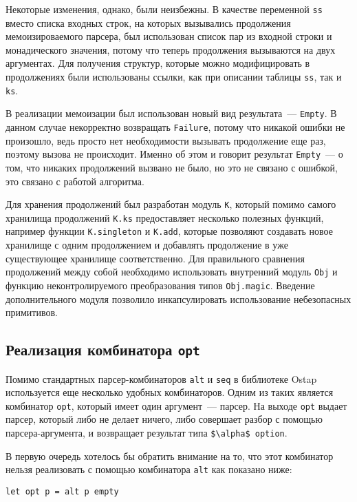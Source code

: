 \documentclass[conference]{IEEEtran}
\begin{document}
Некоторые изменения, однако, были неизбежны. В качестве переменной  \lstinline|ss| вместо списка входных строк, на которых вызывались продолжения мемоизироваемого парсера, был использован список
пар из входной строки и монадического значения, потому что теперь продолжения вызываются на двух аргументах. Для получения структур, которые можно модифицировать в продолжениях были
использованы ссылки, как при описании таблицы \lstinline|ss|, так и \lstinline|ks|.

В реализации мемоизации был использован новый вид результата~--- \lstinline|Empty|. В данном случае некорректно возвращать \lstinline|Failure|, потому что никакой ошибки не произошло,
ведь просто нет необходимости вызывать продолжение еще раз, поэтому вызова не происходит. Именно об этом и говорит результат \lstinline|Empty|~--- о том, что никаких продолжений
вызвано не было, но это не связано с ошибкой, это связано с работой алгоритма.

Для хранения продолжений был разработан модуль \lstinline|K|, который помимо самого хранилища продолжений \lstinline|K.ks| предоставляет несколько полезных функций, например
функции \lstinline|K.singleton| и  \lstinline|K.add|, которые позволяют создавать новое хранилище с одним продолжением и добавлять продолжение в уже существующее хранилище
соответственно. Для правильного сравнения продолжений между собой необходимо использовать внутренний модуль \lstinline|Obj| и функцию неконтролируемого преобразования типов
\lstinline|Obj.magic|. Введение дополнительного модуля позволило инкапсулировать использование небезопасных примитивов.

\subsection{Реализация комбинатора \lstinline|opt|}

Помимо стандартных парсер-комбинаторов \lstinline|alt| и \lstinline|seq| в библиотеке Ostap используется еще несколько удобных комбинаторов. Одним из таких является комбинатор
\lstinline|opt|, который имеет один аргумент~--- парсер. На выходе \lstinline|opt| выдает парсер, который либо не делает ничего, либо совершает разбор с помощью парсера-аргумента,
и возвращает результат типа \lstinline|$\alpha$ option|.

В первую очередь хотелось бы обратить внимание на то, что этот комбинатор нельзя реализовать с помощью комбинатора \lstinline|alt| как показано ниже:

\begin{lstlisting}[basicstyle=\small]
  let opt p = alt p empty
\end{lstlisting}
\end{document}
